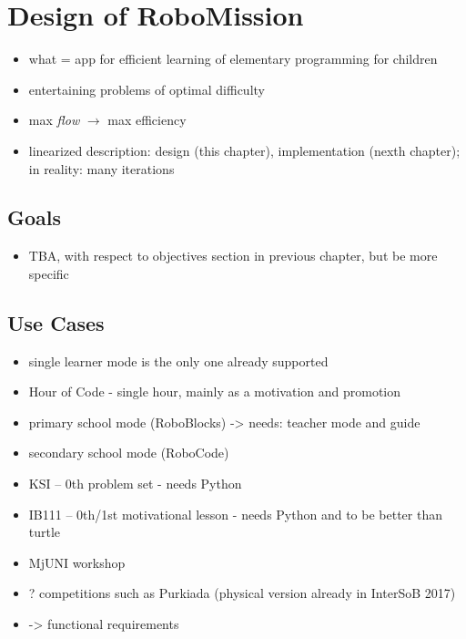 \chapter{Design of RoboMission}
\label{chap:design-of-robomission}

\begin{itemize}
\item what = app for efficient learning of elementary programming for children
\item entertaining problems of optimal difficulty
\item max \emph{flow} $\rightarrow$ max efficiency
\item linearized description: design (this chapter), implementation (nexth chapter); in reality: many iterations
\end{itemize}




\section{Goals}
\label{sec:robomission.goals}

\begin{itemize}
\item TBA, with respect to objectives section in previous chapter, but be more specific
\end{itemize}




\section{Use Cases}
\label{sec:robomission.use-cases}

\begin{itemize}
\item single learner mode is the only one already supported
\item Hour of Code  - single hour,  mainly as a motivation and promotion
\item primary school mode (RoboBlocks) -> needs: teacher mode and guide
\item secondary school mode (RoboCode)
\item KSI -- 0th problem set - needs Python
\item IB111 -- 0th/1st motivational lesson - needs Python and to be better than turtle
\item MjUNI workshop
\item ? competitions such as Purkiada (physical version already in InterSoB 2017)
\item -> functional requirements
\end{itemize}




